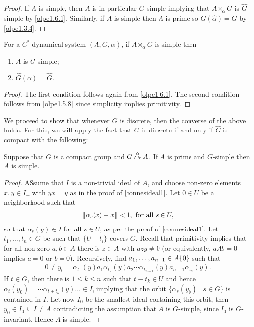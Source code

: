 \begin{proof}
	If $A$ is simple, then $A$ is in particular $G$-simple implying that $A \rtimes_\alpha G$ is $\hat G$-simple by \cref{olpe1.6.1}. Similarly, if $A$ is simple then $A$ is prime so $G(\hat \alpha) = G$ by \cref{olpe1.3.4}.
\end{proof}
\begin{proposition}
	For a $C^*$-dynamical system $(A,G,\alpha)$, if $A \rtimes_\alpha G$ is simple then 
	\begin{enumerate}
		\item $A$ is $G$-simple;
		\item $\hat G(\alpha)= \hat G$.
	\end{enumerate}
	\label{olpe1.6.3}
\end{proposition}
\begin{proof}
	The first condition follows again from \cref{olpe1.6.1}. The second condition follows from \cref{olpe1.5.8} since simplicity implies primitivity.
\end{proof}
We proceed to show that whenever $G$ is discrete, then the converse of the above holds. For this, we will apply the fact that $G$ is discrete if and only if $\hat G$ is compact with the following:
\begin{lemma}
	Suppose that $G$ is a compact group and $G \stackrel{\alpha}{\curvearrowright} A$. If $A$ is prime and $G$-simple then $A$ is simple.	
	\label{olpe1.6.4}
\end{lemma}
\begin{proof}
	ASsume that $I$ is a non-trivial ideal of $A$, and choose non-zero elements $x,y \in I_+$ with $yx=y$ as in the proof of \cref{connesideal1}. Let $0 \in U$ be a neighborhood such that 
	\begin{align*}
		\left\lVert \alpha_s(x)-x\right\rVert < 1, \text{ for all }s \in U,
	\end{align*}
	so that $\alpha_s(y) \in I$ for all $s \in U$, as per the proof of \cref{connesideal1}. Let $t_1,\dots,t_n \in G$ be such that $\{ U - t_i\}$ covers $G$. Recall that primitivity implies that for all non-zero $a,b \in A$ there is $z \in A$ with $azy \neq 0$ (or equivalently, $aAb = 0 $ implies $a=0$ or $b = 0$). Recursively, find $a_1,\dots,a_{n-1} \in A \\ \{0\}$ such that
	\begin{align*}
	0 \neq	y_0 = \alpha_{t_1}(y) a_1 \alpha_{t_2}(y) a_2\cdots \alpha_{t_{n-1}}(y) a_{n-1} \alpha_{t_n}(y).
	\end{align*}
	If $t \in G$, then there is $1 \leq k \leq n$ such that $t-t_k \in U$ and hence $\alpha_t(y_0) = \cdots \alpha_{t+t_k}(y) \dots \in I$, implying that the orbit $\{\alpha_s(y_0) \mid s \in G\}$ is contained in $I$. Let now $I_0$ be the smallest ideal containing this orbit, then $y_0 \in I_0 \subseteq I \neq A$ contradicting the assumption that $A$ is $G$-simple, since $I_0$ is $G$-invariant. Hence $A$ is simple.
\end{proof}
